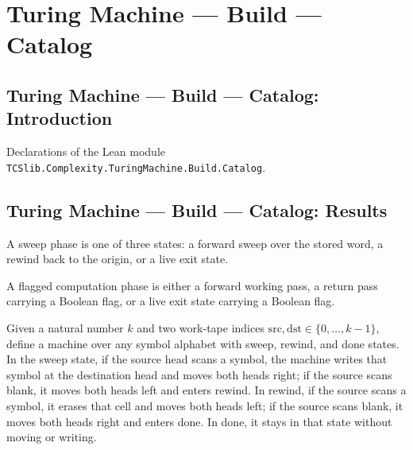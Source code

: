 \section{Turing Machine --- Build --- Catalog}
\subsection*{Turing Machine --- Build --- Catalog: Introduction}

Declarations of the Lean module \texttt{TCSlib.Complexity.TuringMachine.Build.Catalog}.

\subsection*{Turing Machine --- Build --- Catalog: Results}

\begin{definition}
\label{Turing.SweepPhase}
\leanok
A sweep phase is one of three states: a forward sweep over the stored word, a rewind
back to the origin, or a live exit state.
\end{definition}

\begin{definition}
\label{Turing.FlagPhase}
\leanok
A flagged computation phase is either a forward working pass, a return pass carrying a
Boolean flag, or a live exit state carrying a Boolean flag.
\end{definition}

\begin{definition}
\label{Turing.transferTM}
\leanok
{}
Given a natural number $k$ and two work-tape indices
$\mathrm{src},\mathrm{dst}\in\{0,\ldots,k-1\}$, define a machine over any symbol
alphabet with sweep, rewind, and done states. In the sweep state, if the source head
scans a symbol, the machine writes that symbol at the destination head and moves both
heads right; if the source scans blank, it moves both heads left and enters rewind. In
rewind, if the source scans a symbol, it erases that cell and moves both heads left; if
the source scans blank, it moves both heads right and enters done. In done, it stays in
that state without moving or writing.
\end{definition}

